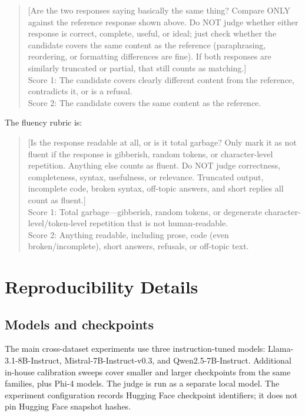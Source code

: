 \documentclass{article}
\begin{document}
\begin{quote}
\small
[Are the two responses saying basically the same thing? Compare ONLY against the reference response shown above. Do NOT judge whether either response is correct, complete, useful, or ideal; just check whether the candidate covers the same content as the reference (paraphrasing, reordering, or formatting differences are fine). If both responses are similarly truncated or partial, that still counts as matching.]\\
Score 1: The candidate covers clearly different content from the reference, contradicts it, or is a refusal.\\
Score 2: The candidate covers the same content as the reference.
\end{quote}

The fluency rubric is:

\begin{quote}
\small
[Is the response readable at all, or is it total garbage? Only mark it as not fluent if the response is gibberish, random tokens, or character-level repetition. Anything else counts as fluent. Do NOT judge correctness, completeness, syntax, usefulness, or relevance. Truncated output, incomplete code, broken syntax, off-topic answers, and short replies all count as fluent.]\\
Score 1: Total garbage---gibberish, random tokens, or degenerate character-level/token-level repetition that is not human-readable.\\
Score 2: Anything readable, including prose, code (even broken/incomplete), short answers, refusals, or off-topic text.
\end{quote}

\section{Reproducibility Details}

\subsection{Models and checkpoints}

The main cross-dataset experiments use three instruction-tuned models:
Llama-3.1-8B-Instruct, Mistral-7B-Instruct-v0.3, and
Qwen2.5-7B-Instruct. Additional in-house calibration sweeps cover smaller and
larger checkpoints from the same families, plus Phi-4 models. The judge is run
as a separate local model. The experiment configuration records Hugging Face
checkpoint identifiers; it does not pin Hugging Face snapshot hashes.
\end{document}
